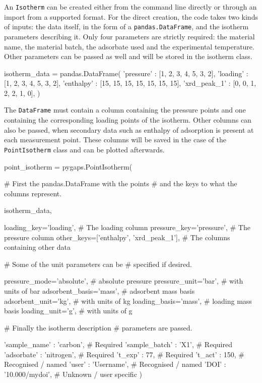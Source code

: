 An \texttt{Isotherm} can be created either from the command line 
directly or through an import from a supported format. For the direct
creation, the code takes
two kinds of inputs: the data itself, in the form of a 
\texttt{pandas.DataFrame}, and the isotherm parameters describing it.
Only four parameters are strictly required:
the material name, the material batch, the adsorbate used and the 
experimental temperature. Other parameters can be passed as well 
and will be stored in the isotherm class.

\begin{python}[caption={Creating the \texttt{DataFrame}},%
    label={pyg:lst:isodata}]
isotherm_data = pandas.DataFrame({
    'pressure' : [1, 2, 3, 4, 5, 3, 2],
    'loading' : [1, 2, 3, 4, 5, 3, 2],
    'enthalpy' : [15, 15, 15, 15, 15, 15, 15],
    'xrd_peak_1' : [0, 0, 1, 2, 2, 1, 0],
})
\end{python}

The \texttt{DataFrame} must contain a column containing the pressure
points and one containing the corresponding loading points of the 
isotherm. Other columns can also be passed, when
secondary data such as enthalpy of adsorption is present at 
each measurement point. These columns will be saved in the case of
the \texttt{PointIsotherm} class and can be
plotted afterwards.

\begin{python}[float=htb, caption=Creating the \texttt{PointIsotherm},
    label={pyg:lst:isocreation}]
point_isotherm = pygaps.PointIsotherm(

    # First the pandas.DataFrame with the points
    # and the keys to what the columns represent.

    isotherm_data,

    loading_key='loading',          # The loading column
    pressure_key='pressure',        # The pressure column
    other_keys=['enthalpy',
                'xrd_peak_1'],      # The columns containing other data

    # Some of the unit parameters can be 
    # specified if desired.

    pressure_mode='absolute',       # absolute pressure
    pressure_unit='bar',            # with units of bar
    adsorbent_basis='mass',         # adsorbent mass basis
    adsorbent_unit='kg',            # with units of kg
    loading_basis='mass',           # loading mass basis
    loading_unit='g',               # with units of g

    # Finally the isotherm description
    # parameters are passed.

    'sample_name' : 'carbon',       # Required
    'sample_batch' : 'X1',          # Required
    'adsorbate' : 'nitrogen',       # Required
    't_exp' : 77,                   # Required
    't_act' : 150,                  # Recognised / named
    'user'  : 'Username',           # Recognised / named
    'DOI'   : '10.000/mydoi',       # Unknown / user specific
)
\end{python}

